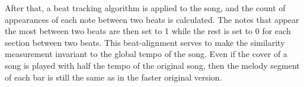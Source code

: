 \FloatBarrier

\noindent After that, a beat tracking algorithm is applied to the song, and the count of appearances of each note between two beats is calculated. The notes that appear the most between two beats are then set to 1 while the rest is set to 0 for each section between two beats. This beat-alignment serves to make the similarity measurement invariant to the global tempo of the song. Even if the cover of a song is played with half the tempo of the original song, then the melody segment of each bar is still the same as in the faster original version.

\begin{figure}[htbp]
	\centering
\end{figure}
